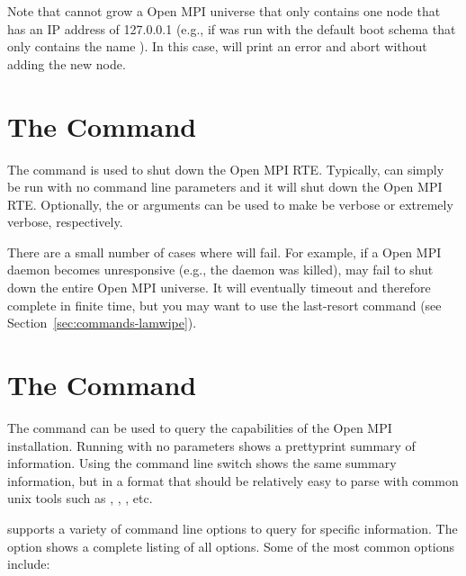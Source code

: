 Note that  cannot grow a Open MPI universe that only contains
one node that has an IP address of 127.0.0.1 (e.g., if 
was run with the default boot schema that only contains the name
).  In this case,  will print an error
and abort without adding the new node.


\section{The  Command}
\label{sec:commands-lamhalt}

The  command is used to shut down the Open MPI RTE.
Typically,  can simply be run with no command line
parameters and it will shut down the Open MPI RTE.  Optionally, the
 or  arguments can be used to make 
be verbose or extremely verbose, respectively.

There are a small number of cases where  will fail.  For
example, if a Open MPI daemon becomes unresponsive (e.g., the daemon was
killed),  may fail to shut down the entire Open MPI universe.
It will eventually timeout and therefore complete in finite time, but
you may want to use the last-resort  command (see
Section~\ref{sec:commands-lamwipe}).


\section{The  Command}
\label{sec:commands-laminfo}

The  command can be used to query the capabilities of the
Open MPI installation.  Running  with no parameters shows
a prettyprint summary of information.  Using the 
command line switch shows the same summary information, but in a
format that should be relatively easy to parse with common unix tools
such as , , , etc.

 supports a variety of command line options to query for
specific information.  The  option shows a complete listing
of all options.  Some of the most common options include:

